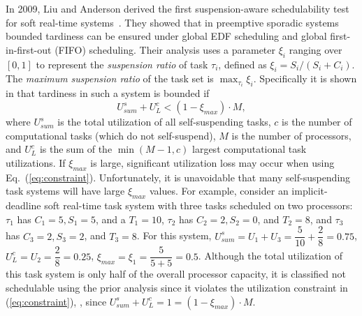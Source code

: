 In 2009, Liu and Anderson derived the first suspension-aware schedulability test for soft real-time systems~\cite{Liu3}. They showed that in preemptive sporadic systems bounded tardiness can be ensured under global EDF scheduling and global first-in-first-out (FIFO) scheduling. Their analysis uses a parameter $\xi_i$ ranging over $[0,1]$ to represent the \textit{suspension ratio} of task $\tau_i$, defined as $\xi_i = S_i/(S_i+C_i)$. The \emph{maximum suspension ratio} of the task set is $\max_{\tau_i} \xi_i$.
Specifically it is shown in \cite{Liu3} that tardiness in such a system is bounded if 
\begin{equation}\label{eq:constraint} U_{sum}^s + U_L^c < (1-\xi_{max}) \cdot M , \end{equation}
where $U_{sum}^s$ is the total utilization of all self-suspending tasks, $c$ is the number of computational tasks (which do not self-suspend), $M$ is the number of processors, and $U_L^c$ is the sum of the $\min(M-1,c)$ largest computational task utilizations. If $\xi_{max}$ is large, significant utilization loss may occur when using Eq.~(\ref{eq:constraint}). Unfortunately, it is unavoidable that many self-suspending task systems will have large $\xi_{max}$ values. For example, consider an implicit-deadline soft real-time task system with three tasks scheduled on two processors: $\tau_1$ has $C_1=5, S_1=5$, and a $T_1=10$, $\tau_2$ has $C_2=2, S_2=0$, and $T_2=8$, and $\tau_3$ has $C_3=2, S_3=2$, and $T_3=8$. For this system, $U_{sum}^s = U_1+U_3= \dfrac{5}{10} + \dfrac{2}{8} = 0.75$, $U_L^c = U_2 = \dfrac{2}{8} = 0.25$, $\xi_{max} = \xi_1 = \dfrac{5}{5+5} = 0.5$. Although the total utilization of this task system is only half of the overall processor capacity, it is classified not schedulable using the prior analysis since it violates the utilization constraint in (\ref{eq:constraint}), \ie, since $U_{sum}^s+U_L^c =1=(1-\xi_{max}) \cdot M$.

